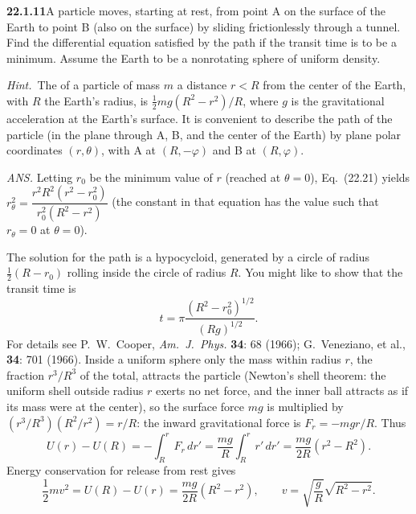 \par\bigskip
\noindent\textbf{22.1.11}\quad A particle moves, starting at rest,
from point A on the surface of the Earth to point B (also on the
surface) by sliding frictionlessly through a tunnel. Find the
differential equation satisfied by the path if the transit time
is to be a minimum. Assume the Earth to be a nonrotating sphere
of uniform density.
\par\emph{Hint.}~The  of a particle of mass $m$ a
distance $r<R$ from the center of the Earth, with $R$ the Earth's
radius, is $\tfrac{1}{2}mg(R^{2}-r^{2})/R$, where $g$ is the
gravitational acceleration at the Earth's surface. It is
convenient to describe the path of the particle (in the plane
through A, B, and the center of the Earth) by plane polar
coordinates $(r,\theta)$, with A at $(R,-\varphi)$ and B at
$(R,\varphi)$.
\par\nobreak\hfill\emph{ANS.}\enspace
Letting $r_{0}$ be the minimum value of $r$ (reached at
$\theta=0$), Eq.~(22.21) yields
$r_{\theta}^{2}=\dfrac{r^{2}R^{2}(r^{2}-r_{0}^{2})}
{r_{0}^{2}(R^{2}-r^{2})}$ (the constant in that equation has the
value such that $r_{\theta}=0$ at $\theta=0$).
\par The solution for the path is a hypocycloid, generated by a
circle of radius $\tfrac{1}{2}(R-r_{0})$ rolling inside the
circle of radius $R$. You might like to show that the transit
time is
\[
t=\pi\frac{(R^{2}-r_{0}^{2})^{1/2}}{(Rg)^{1/2}}.
\]
For details see P.~W.~Cooper, \emph{Am.~J.~Phys.} \textbf{34}: 68
(1966); G.~Veneziano, et al., \textbf{34}: 701 (1966).
\solution
Inside a uniform sphere only the mass within radius $r$, the fraction
$r^3/R^3$ of the total, attracts the particle (Newton's shell theorem:
the uniform shell outside radius $r$ exerts no net force, and the inner
ball attracts as if its mass were at the center), so the surface force
$mg$ is multiplied by $(r^3/R^3)(R^2/r^2)=r/R$: the inward
gravitational force is $F_r=-mgr/R$. Thus
\[
U(r)-U(R)=-\int_R^rF_r\,dr'=\frac{mg}{R}\int_R^rr'\,dr'
=\frac{mg}{2R}(r^2-R^2).
\]
Energy conservation for release from rest gives
\[
\frac12mv^2=U(R)-U(r)=\frac{mg}{2R}(R^2-r^2),\qquad
v=\sqrt{\frac gR}\sqrt{R^2-r^2}.
\]
